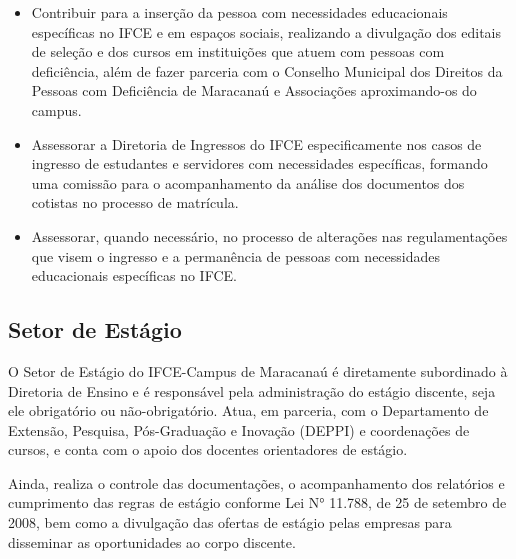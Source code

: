\documentclass{paper}
\begin{document}
\begin{itemize}
\item Contribuir para a inserção da pessoa com necessidades educacionais específicas no IFCE e em espaços sociais, realizando a divulgação dos editais de seleção e dos cursos em instituições que atuem com pessoas com deficiência, além de fazer parceria com o Conselho Municipal dos Direitos da Pessoas com Deficiência de Maracanaú e Associações aproximando-os do campus.
\item Assessorar a Diretoria de Ingressos do IFCE especificamente nos casos de ingresso de estudantes e servidores com necessidades específicas, formando uma comissão para o acompanhamento da análise dos documentos dos cotistas no processo de matrícula.
\item Assessorar, quando necessário, no processo de alterações nas regulamentações que visem o ingresso e a permanência de pessoas com necessidades educacionais específicas no IFCE.
\end{itemize}

\subsection{Setor de Estágio} 


O Setor de Estágio do IFCE-Campus de Maracanaú é diretamente subordinado à Diretoria de Ensino e é responsável pela administração do estágio discente, seja ele obrigatório ou não-obrigatório. Atua, em parceria, com o Departamento de Extensão, Pesquisa, Pós-Graduação e Inovação (DEPPI) e coordenações de cursos, e conta com o apoio dos docentes orientadores de estágio.

Ainda, realiza o controle das documentações, o acompanhamento dos relatórios e cumprimento das regras de estágio conforme Lei N° 11.788, de 25 de setembro de 2008, bem como a divulgação das ofertas de estágio pelas empresas para disseminar as oportunidades ao corpo discente.
\end{document}
